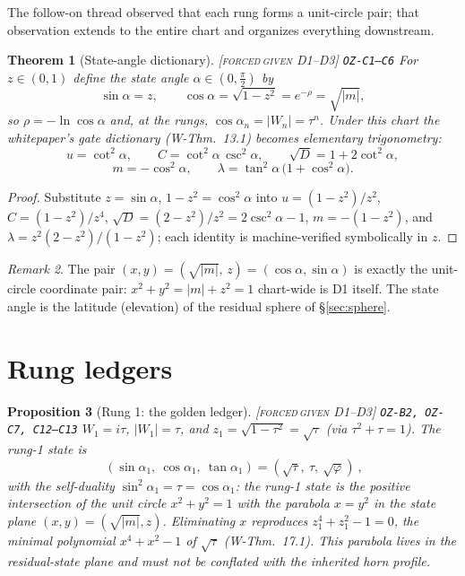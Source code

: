 \documentclass[11pt]{article}
\newcommand{\tagFD}{\textcolor{cF}{\textsc{[forced}}\,\textcolor{cD}{\textsc{given D1--D3]}}}
\newcommand{\hx}[1]{\textcolor{cC}{\footnotesize\texttt{#1}}}
\newcommand{\gp}{\varphi}
\theoremstyle{plain}
\newtheorem{theorem}{Theorem}[section]
\newtheorem{proposition}[theorem]{Proposition}
\theoremstyle{definition}
\theoremstyle{remark}
\newtheorem{remark}[theorem]{Remark}
\begin{document}
The follow-on thread observed that each rung forms a unit-circle pair; that
observation extends to the entire chart and organizes everything downstream.

\begin{theorem}[State-angle dictionary]\label{thm:stateangle}\tagFD{} \hx{OZ-C1--C6}
For $z\in(0,1)$ define the \emph{state angle} $\alpha\in(0,\tfrac\pi2)$ by
\[
\sin\alpha=z,\qquad \cos\alpha=\sqrt{1-z^2}=e^{-\rho}=\sqrt{|m|},
\]
so $\rho=-\ln\cos\alpha$ and, at the rungs, $\cos\alpha_n=|W_n|=\tau^n$.
Under this chart the whitepaper's gate dictionary (W-Thm.\ 13.1) becomes
elementary trigonometry:
\[
u=\cot^2\alpha,\qquad
C=\cot^2\alpha\,\csc^2\alpha,\qquad
\sqrt D=1+2\cot^2\alpha,
\]
\[
m=-\cos^2\alpha,\qquad
\lambda=\tan^2\alpha\,\bigl(1+\cos^2\alpha\bigr).
\]
\end{theorem}

\begin{proof}
Substitute $z=\sin\alpha$, $1-z^2=\cos^2\alpha$ into $u=(1-z^2)/z^2$,
$C=(1-z^2)/z^4$, $\sqrt D=(2-z^2)/z^2=2\csc^2\alpha-1$,
$m=-(1-z^2)$, and $\lambda=z^2(2-z^2)/(1-z^2)$; each identity is
machine-verified symbolically in $z$.
\end{proof}

\begin{remark}
The pair $(x,y)=(\sqrt{|m|},\,z)=(\cos\alpha,\sin\alpha)$ is exactly the
unit-circle coordinate pair: $x^2+y^2=|m|+z^2=1$ chart-wide is D1 itself.
The state angle is the latitude (elevation) of the residual sphere of
\S\ref{sec:sphere}.
\end{remark}

\section{Rung ledgers}\label{sec:ledgers}

\begin{proposition}[Rung 1: the golden ledger]\label{prop:rung1}\tagFD{} \hx{OZ-B2, OZ-C7, C12--C13}
$W_1=i\tau$, $|W_1|=\tau$, and $z_1=\sqrt{1-\tau^2}=\sqrt\tau$ (via
$\tau^2+\tau=1$). The rung-1 state is
\[
\boxed{\ (\sin\alpha_1,\ \cos\alpha_1,\ \tan\alpha_1)=(\sqrt\tau,\ \tau,\ \sqrt\gp)\ },
\]
with the self-duality $\sin^2\alpha_1=\tau=\cos\alpha_1$: the rung-1 state is the
positive intersection of the unit circle $x^2+y^2=1$ with the parabola $x=y^2$ in
the state plane $(x,y)=(\sqrt{|m|},z)$. Eliminating $x$ reproduces
$z_1^4+z_1^2-1=0$, the minimal polynomial $x^4+x^2-1$ of $\sqrt\tau$
(W-Thm.\ 17.1). This parabola lives in the residual-state plane and must not be
conflated with the inherited horn profile.
\end{proposition}
\end{document}
